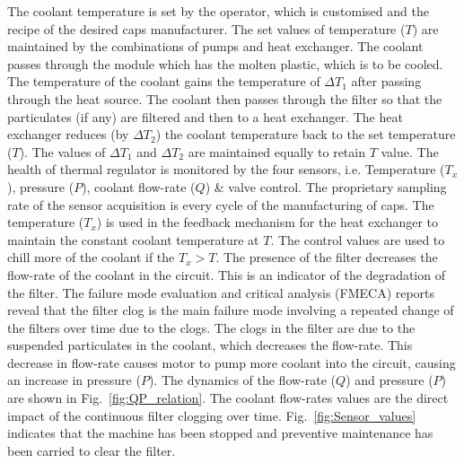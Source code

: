 \documentclass[conference]{IEEEtran}
\begin{document}
The coolant temperature is set by the operator, which is customised and the recipe of the desired caps manufacturer. The set values of temperature ($T$) are maintained by the combinations of pumps and heat exchanger. The coolant passes through the module which has the molten plastic, which is to be cooled. The temperature of the coolant gains the temperature of $\Delta T_1$ after passing through the heat source. The coolant then passes through the filter so that the particulates (if any) are filtered and then to a heat exchanger. The heat exchanger reduces (by $\Delta T_2$) the coolant temperature back to the set temperature ($T$). The values of $\Delta T_1$ and $\Delta T_2$ are maintained equally to retain $T$ value.
The health of thermal regulator is monitored by the four sensors, i.e. Temperature ($T_x$), pressure ($P$), coolant flow-rate ($Q$) \& valve control. The proprietary sampling rate of the sensor acquisition is every cycle of the manufacturing of caps. The temperature ($T_x$) is used in the feedback mechanism for the heat exchanger to maintain the constant coolant temperature at $T$. The control values are used to chill more of the coolant if the $T_x>T$. The presence of the filter decreases the flow-rate of the coolant in the circuit. This is an indicator of the degradation of the filter. The failure mode evaluation and critical analysis (FMECA) reports reveal that the filter clog is the main failure mode involving a repeated change of the filters over time due to the clogs. The clogs in the filter are due to the suspended particulates in the coolant, which decreases the flow-rate. This decrease in flow-rate causes motor to pump more coolant into the circuit, causing an increase in pressure ($P$). The dynamics of the flow-rate ($Q$) and pressure ($P$) are shown in Fig.~\ref{fig:QP_relation}. The coolant flow-rates values are the direct impact of the continuous filter clogging over time. Fig.~\ref{fig:Sensor_values} indicates that the machine has been stopped and preventive maintenance has been carried to clear the filter.
\end{document}
